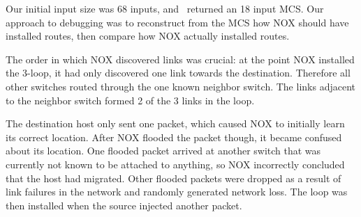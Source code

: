 Our initial input size was 68 inputs, and
\projectname~returned an 18 input MCS.
Our approach to debugging was to
reconstruct from the MCS how NOX should have installed routes, then compare
how NOX actually installed routes.

The order in which NOX discovered links was crucial: at the point NOX
installed the 3-loop, it had only discovered one link towards the destination.
Therefore all other switches routed through the one known neighbor switch. The
links adjacent to the neighbor switch formed 2 of the 3 links in the loop.

The destination host only sent one packet, which caused NOX to initially learn
its correct location. After NOX flooded the packet though, it became confused
about its location. One flooded packet arrived at
another switch that was currently not known to be attached to anything, so NOX
incorrectly concluded that the host had migrated. Other flooded packets were
dropped as a result of link failures in the network and randomly generated
network loss. The loop was then installed when the source injected another
packet.

